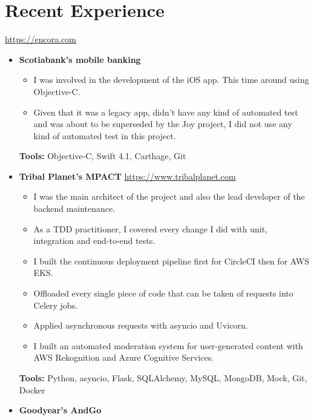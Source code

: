 \documentclass[11pt,a4paper,english]{moderncv}
\begin{document}
\maketitle

\section{Recent Experience}

{
\url{https://encora.com}
\newline{}
\begin{itemize}
    \item \textbf{Scotiabank's mobile banking}
        \begin{itemize}
            \item I was involved in the development of the iOS app. This time around using Objective-C.
            \item Given that it was a legacy app, didn’t have any kind of automated test and was about to be superseded by the Joy project, I did not use any kind of automated test in this project.
        \end{itemize}
        \textbf{Tools:} Objective-C, Swift 4.1, Carthage, Git
    \item \textbf{Tribal Planet's MPACT}
        \newline{}
        \url{https://www.tribalplanet.com}
        \begin{itemize}
            \item I was the main architect of the project and also the lead developer of the backend maintenance.
            \item As a TDD practitioner, I covered every change I did with unit, integration and end-to-end tests.
            \item I built the continuous deployment pipeline first for CircleCI then for AWS EKS.
            \item Offloaded every single piece of code that can be taken of requests into Celery jobs.
            \item Applied asynchronous requests with asyncio and Uvicorn.
            \item I built an automated moderation system for user-generated content with AWS Rekognition and Azure Cognitive Services.
        \end{itemize}
        \textbf{Tools:} Python, asyncio, Flask, SQLAlchemy, MySQL, MongoDB, Mock, Git, Docker
    \item \textbf{Goodyear's AndGo}

\end{itemize}}
\end{document}
